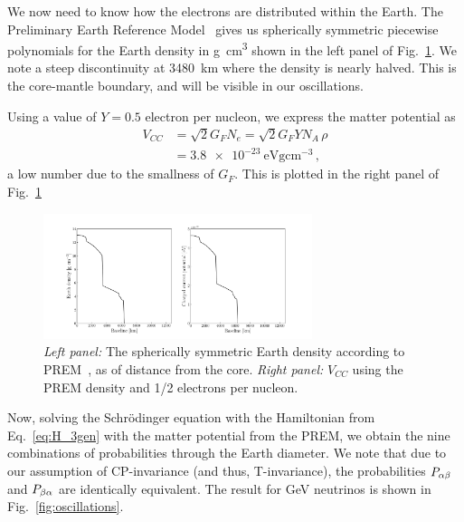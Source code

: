 We now need to know how the electrons are distributed within the Earth. The Preliminary Earth Reference Model~\cite{PREM} gives us spherically
symmetric piecewise polynomials for the Earth density in \si{\gram \cm^3} shown in the left panel of Fig.~\ref{fig:potential}.
We note a steep discontinuity at \SI{3480}{\km} where the density is nearly halved. This is the core-mantle boundary, and will be visible in our 
oscillations.

Using a value of $Y=0.5$ electron per nucleon, we express the matter potential as
\begin{align}
    V_{CC} &= \sqrt{2}G_F N_e = \sqrt{2}G_F Y N_A \,\rho \nonumber \\
           &= \SI{3.8e-23}{\eV \gram \cm^{-3}}\,,
\end{align}
a low number due to the smallness of $G_F$. This is plotted in the right panel of Fig.~\ref{fig:potential}
\begin{figure}
    \centering
    \includegraphics[width=0.7\textwidth]{figures/potential.pdf}
    \caption{\emph{Left panel:} The spherically symmetric Earth density according to PREM~\cite{PREM}, as of distance from the core.
    \emph{Right panel:} $V_{CC}$ using the PREM density and 1/2 electrons per nucleon.}\label{fig:potential}
\end{figure}

Now, solving the Schrödinger equation with the Hamiltonian from Eq.~\ref{eq:H_3gen} with the matter potential from the PREM,
we obtain the nine combinations of probabilities through the Earth diameter. We note that due to our assumption of CP-invariance
(and thus, T-invariance), the probabilities $P_{\alpha\beta}$ and $P_{\beta\alpha}$ are identically equivalent. The result for \si{\GeV} neutrinos 
is shown in Fig.~\ref{fig:oscillations}.

